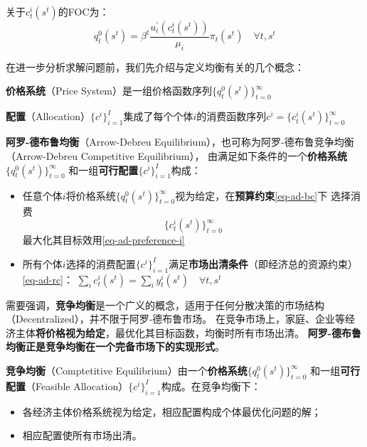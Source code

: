 关于$c_t^i\left(s^t\right)$的FOC为：
\begin{equation}    \label{eq-ad-foc}
    q_t^0\left(s^t\right) = \beta^t \frac{u_i^{\prime}\left(c_t^i\left(s^t\right)\right)}{\mu_i} \pi_t\left(s^t\right)
    \quad \forall t, s^t
\end{equation}

在进一步分析求解问题前，我们先介绍与定义均衡有关的几个概念：
\begin{definition}
    \textbf{价格系统}（Price System）是一组价格函数序列$\{q_t^0\left(s^t\right)\}_{t=0}^{\infty}$
        
\end{definition}
\begin{definition}
    \textbf{配置}（Allocation）$\{c^i\}_{i=1}^{I}$集成了每个个体$i$的消费函数序列$c^i=\{c_t^i\left(s^t\right)\}_{t=0}^{\infty}$
\end{definition}

\begin{definition}
    \textbf{阿罗-德布鲁均衡}（Arrow-Debreu Equilibrium），也可称为阿罗-德布鲁竞争均衡（Arrow-Debreu Competitive Equilibrium），
    由满足如下条件的一个\textbf{价格系统}$\{q_t^0\left(s^t\right)\}_{t=0}^{\infty}$
    和一组\textbf{可行配置}$\{c^i\}_{i=1}^{I}$构成：
    \begin{itemize}
        \item 任意个体$i$将价格系统$\{q_t^0\left(s^t\right)\}_{t=0}^{\infty}$视为给定，在\textbf{预算约束}\ref{eq-ad-bc}下
            选择消费$$\{c_t^i\left(s^t\right)\}_{t=0}^{\infty}$$
            最大化其目标效用\ref{eq-ad-preference-i}
        \item 所有个体$i$选择的消费配置$\{c^i\}_{i=1}^{I}$满足\textbf{市场出清条件}（即经济总的资源约束）\ref{eq-ad-rc}：
        $\sum_i c_t^i\left(s^t\right) = \sum_i y_t^i\left(s^t\right) \quad \forall t, s^t$
    \end{itemize}
\end{definition}

需要强调，\textbf{竞争均衡}是一个广义的概念，适用于任何分散决策的市场结构（Decentralized），并不限于阿罗-德布鲁市场。
在竞争市场上，家庭、企业等经济主体\textbf{将价格视为给定}，最优化其目标函数，均衡时所有市场出清。
\textbf{阿罗-德布鲁均衡正是竞争均衡在一个完备市场下的实现形式}。
\begin{definition}
    \textbf{竞争均衡}（Comptetitive Equilibrium）由一个\textbf{价格系统}$\{q_t^0\left(s^t\right)\}_{t=0}^{\infty}$
    和一组\textbf{可行配置}（Feasible Allocation）$\{c^i\}_{i=1}^{I}$构成。在竞争均衡下：
    \begin{itemize}
        \item 各经济主体价格系统视为给定，相应配置构成个体最优化问题的解；
        \item 相应配置使所有市场出清。
    \end{itemize}
\end{definition}

